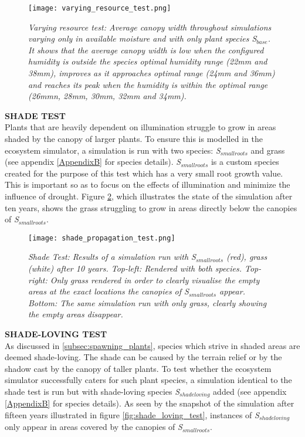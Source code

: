 \begin{figure}
\center
	\texttt{[image: varying\_resource\_test.png]}
	\caption{ \textit{Varying resource test: Average canopy width throughout simulations varying only in available moisture and with only plant species \textit{S$_{base}$}. It shows that the average canopy width is low when the configured humidity is outside the species optimal humidity range (22mm and 38mm), improves as it approaches optimal range (24mm and 36mm) and reaches its peak when the humidity is within the optimal range (26mmn, 28mm, 30mm, 32mm and 34mm).}}
	\label{fig:varying_resource_test}
\end{figure}

\textbf{SHADE TEST}\\

Plants that are heavily dependent on illumination struggle to grow in areas shaded by the canopy of larger plants. To ensure this is modelled in the ecosystem simulator, a simulation is run with two species: \textit{S$_{smallroots}$} and grass (see appendix \ref{AppendixB} for species details). \textit{S$_{smallroots}$} is a custom species created for the purpose of this test which has a very small root growth value. This is important so as to focus on the effects of illumination and minimize the influence of drought. Figure \ref{fig:shade_test}, which illustrates the state of the simulation after ten years, shows the grass struggling to grow in areas directly below the canopies of \textit{S$_{smallroots}$}.\\

\begin{figure}
\center
	\texttt{[image: shade\_propagation\_test.png]}
	\caption{ \textit{Shade Test: Results of a simulation run with \textit{S$_{smallroots}$} (red), grass (white) after 10 years. Top-left: Rendered with both species. Top-right: Only grass rendered in order to clearly visualise the empty areas at the exact locations the canopies of \textit{S$_{smallroots}$} appear. Bottom: The same simulation run with only grass, clearly showing the empty areas disappear.}} 
	\label{fig:shade_test}
\end{figure}

\textbf{SHADE-LOVING TEST}\\

As discussed in \ref{subsec:spawning_plants}, species which strive in shaded areas are deemed shade-loving. The shade can be caused by the terrain relief or by the shadow cast by the canopy of taller plants. To test whether the ecosystem simulator successfully caters for such plant species, a simulation identical to the shade test is run but with shade-loving species \textit{S$_{shadeloving}$} added (see appendix \ref{AppendixB} for species details). As seen by the snapshot of the simulation after fifteen years illustrated in figure \ref{fig:shade_loving_test}, instances of \textit{S$_{shadeloving}$} only appear in areas covered by the canopies of \textit{S$_{smallroots}$}.

